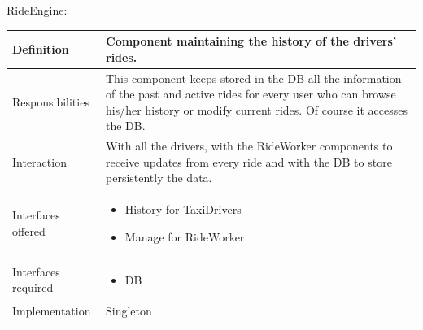 \documentclass[a4paper,11pt]{report} %
\begin{document}
	\pagebreak
	\vspace*{-0.35cm}
	\centerline{RideEngine:}
	\begin{center}
		\begin{tabular}{| l | p{9cm} |}\hline
			Definition & Component maintaining the history of the drivers' rides.\\\hline
			Responsibilities & This component keeps stored in the DB all the information of the past and active rides for every user who can browse his/her history or modify current rides. Of course it accesses the DB.\\\hline
			Interaction & With all the drivers, with the RideWorker components to receive updates from every ride and with the DB to store persistently the data.\\\hline
			Interfaces offered & \begin{itemize}
				\item History for TaxiDrivers
				\item Manage for RideWorker
			\end{itemize}\\\hline
			Interfaces required & \begin{itemize}
				\item DB
			\end{itemize}\\\hline
			Implementation & Singleton\\\hline
		\end{tabular}
	\end{center}		
	
\end{document}
